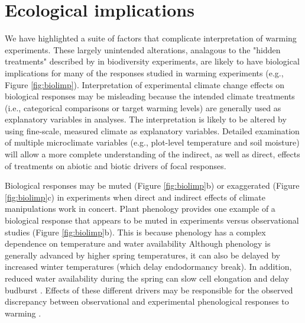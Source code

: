\documentclass{article}
\begin{document}

\section* {Ecological implications}

\par We have highlighted a suite of factors that complicate interpretation of warming experiments. These largely unintended alterations, analagous to the "hidden treatments" described by \citet{huston1997} in biodiversity experiments, are likely to have biological implications for many of the responses studied in warming experiments (e.g., Figure \ref{fig:biolimp}). Interpretation of experimental climate change effects on biological responses may be misleading because the intended climate treatments (i.e., categorical comparisons or target warming levels) are generally used as explanatory variables in analyses. The interpretation is likely to be altered by using fine-scale, measured climate as explanatory variables. Detailed examination of multiple microclimate variables (e.g., plot-level temperature and soil moisture) will allow a more complete understanding of the indirect, as well as direct, effects of treatments on abiotic and biotic drivers of focal responses.

\par Biological responses may be muted  (Figure \ref{fig:biolimp}b) or exaggerated  (Figure \ref{fig:biolimp}c) in experiments when direct and indirect effects of climate manipulations work in concert. Plant phenology provides one example of a biological response that appears to be muted in experiments versus observational studies (Figure \ref{fig:biolimp}b). This is because phenology has a complex dependence on temperature and water availability \citep[as well as other factors,][]{davis2015} Although phenology is generally advanced by higher spring temperatures, it can also be delayed by increased winter temperatures (which delay endodormancy break). In addition, reduced water availability during the spring can slow cell elongation and delay budburst \citep{penuelas2004,ourcival2011,craine2012,matthews2016}. Effects of these different drivers may be responsible for the observed discrepancy between observational and experimental phenological responses to warming \citep{wolkovich2012}. 
\end{document}
